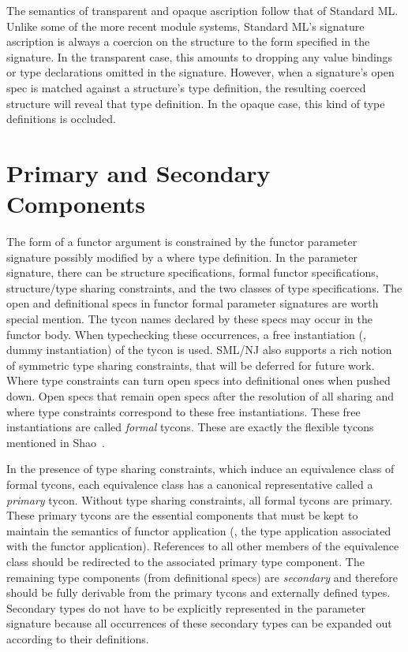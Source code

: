 The semantics of transparent and opaque ascription follow that of Standard ML. Unlike some of the more recent module systems, Standard ML's signature ascription is always a coercion on the structure to the form specified in the signature. In the transparent case, this amounts to dropping any value bindings or type declarations omitted in the signature. However, when a signature's open spec is matched against a structure's type definition, the resulting coerced structure will reveal that type definition. In the opaque case, this kind of type definitions is occluded. 

\section{Primary and Secondary Components}\label{sec:primaries}
The form of a functor argument is constrained by the functor parameter signature possibly modified by a where type definition. In the parameter signature, there can be structure specifications, formal functor specifications, structure/type sharing constraints, and the two classes of type specifications. The open and definitional specs in functor formal parameter signatures are worth special mention. The tycon names declared by these specs may occur in the functor body. When typechecking these occurrences, a free instantiation (\ie, dummy instantiation) of the tycon is used. SML/NJ also supports a rich notion of symmetric type sharing constraints, that will be deferred for future work. Where type constraints can turn open specs into definitional ones when pushed down. Open specs that remain open specs after the resolution of all sharing and where type constraints correspond to these free instantiations. These free instantiations are called \emph{formal} tycons. These are exactly the flexible tycons mentioned in Shao~\cite{shao98}. 

In the presence of type sharing constraints, which induce an equivalence class of formal tycons, each equivalence class has a canonical representative called a \emph{primary} tycon. Without type sharing constraints, all formal tycons are primary.
These primary tycons are the essential components that must be kept to maintain the semantics of functor application (\ie, the type application associated with the functor application). References to all other members of the equivalence class should be redirected to the associated primary type component. The remaining type components (from definitional specs) are \emph{secondary} and therefore should be fully derivable from the primary tycons and externally defined types. Secondary types do not have to be explicitly represented in the parameter signature because all occurrences of these secondary types can be expanded out according to their definitions. 

